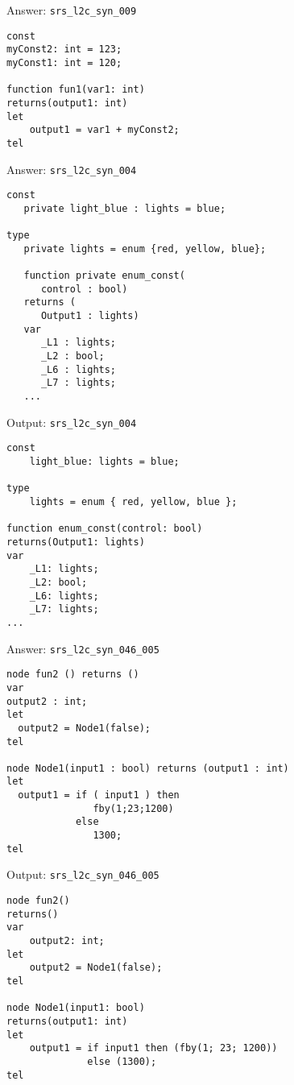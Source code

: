 \documentclass{beamer}
\begin{document}
\begin{frame}[fragile]{Answer: \texttt{srs\_l2c\_syn\_009}}
    \begin{lstlisting}
const
myConst2: int = 123;
myConst1: int = 120;

function fun1(var1: int)
returns(output1: int)
let
    output1 = var1 + myConst2;
tel
    \end{lstlisting}
\end{frame}

\begin{frame}[fragile]{Answer: \texttt{srs\_l2c\_syn\_004}}
    \begin{lstlisting}
const
   private light_blue : lights = blue;

type
   private lights = enum {red, yellow, blue};

   function private enum_const(
      control : bool)
   returns (
      Output1 : lights)
   var
      _L1 : lights;
      _L2 : bool;
      _L6 : lights;
      _L7 : lights;
   ...
    \end{lstlisting}
\end{frame}

\begin{frame}[fragile]{Output: \texttt{srs\_l2c\_syn\_004}}
    \begin{lstlisting}
const
    light_blue: lights = blue;

type
    lights = enum { red, yellow, blue };

function enum_const(control: bool)
returns(Output1: lights)
var
    _L1: lights;
    _L2: bool;
    _L6: lights;
    _L7: lights;
...
    \end{lstlisting}
\end{frame}

\begin{frame}[fragile]{Answer: \texttt{srs\_l2c\_syn\_046\_005}}
    \begin{lstlisting}
node fun2 () returns ()
var
output2 : int;
let
  output2 = Node1(false);
tel

node Node1(input1 : bool) returns (output1 : int)
let
  output1 = if ( input1 ) then
               fby(1;23;1200)
            else
               1300;
tel
    \end{lstlisting}
\end{frame}

\begin{frame}[fragile]{Output: \texttt{srs\_l2c\_syn\_046\_005}}
    \begin{lstlisting}
node fun2()
returns()
var
    output2: int;
let
    output2 = Node1(false);
tel

node Node1(input1: bool)
returns(output1: int)
let
    output1 = if input1 then (fby(1; 23; 1200))
              else (1300);
tel
    \end{lstlisting}
\end{frame}
\end{document}
